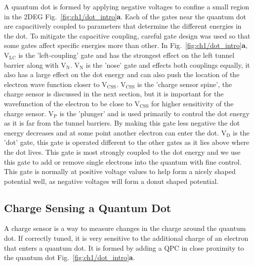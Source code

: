 A quantum dot is formed by applying negative voltages to confine a small region in the 2DEG Fig.~\ref{fig:ch1/dot_intro}\textbf{a}.
Each of the gates near the quantum dot are capacitively coupled to parameters that determine the different energies in the dot. To mitigate the capacitive coupling, careful gate design was used so that some gates affect specific energies more than other. In Fig.~\ref{fig:ch1/dot_intro}\textbf{a}, $\mathrm{V_{LC}}$ is the 'left-coupling' gate and has the strongest effect on the left tunnel barrier along with $\mathrm{V_{N}}$. $\mathrm{V_{N}}$ is the 'nose' gate and effects both couplings equally, it also has a large effect on the dot energy and can also push the location of the electron wave function closer to $\mathrm{V_{CSS}}$. $\mathrm{V_{CSS}}$ is the 'charge sensor spine', the charge sensor is discussed in the next section, but it is important for the wavefunction of the electron to be close to $\mathrm{V_{CSS}}$ for higher sensitivity of the charge sensor. $\mathrm{V_{P}}$ is the 'plunger' and is used primarily to control the dot energy as it is far from the tunnel barriers. By making this gate less negative the dot energy decreases and at some point another electron can enter the dot. $\mathrm{V_{D}}$ is the 'dot' gate, this gate is operated different to the other gates as it lies above where the dot lives. This gate is most strongly coupled to the dot energy and we use this gate to add or remove single electrons into the quantum with fine control. This gate is normally at positive voltage values to help form a nicely shaped potential well, as negative voltages will form a donut shaped potential. 



\afterpage{\clearpage}
\subsection{Charge Sensing a Quantum Dot}


A charge sensor is a way to measure changes in the charge around the quantum dot. If correctly tuned, it is very sensitive to the additional charge of an electron that enters a quantum dot. It is formed by adding a QPC in close proximity to the quantum dot Fig.~\ref{fig:ch1/dot_intro}\textbf{a}. 

